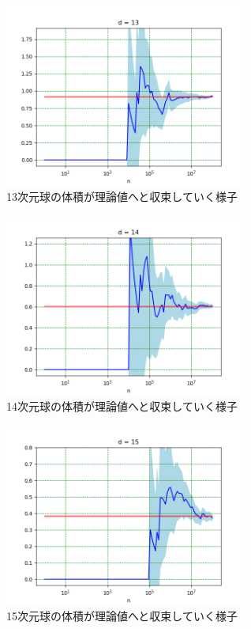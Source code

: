 \documentclass[a4paper,twoside]{jarticle}
\begin{document}
\begin{figure}[H]
\begin{center}
\includegraphics[width=8cm]{../python/report1_monte_carlo/out/r2plot13d.png}
\end{center}
\caption{13次元球の体積が理論値へと収束していく様子}
\end{figure}

\begin{figure}[H]
\begin{center}
\includegraphics[width=8cm]{../python/report1_monte_carlo/out/r2plot14d.png}
\end{center}
\caption{14次元球の体積が理論値へと収束していく様子}
\end{figure}

\begin{figure}[H]
\begin{center}
\includegraphics[width=8cm]{../python/report1_monte_carlo/out/r2plot15d.png}
\end{center}
\caption{15次元球の体積が理論値へと収束していく様子}
\end{figure}
\end{document}
